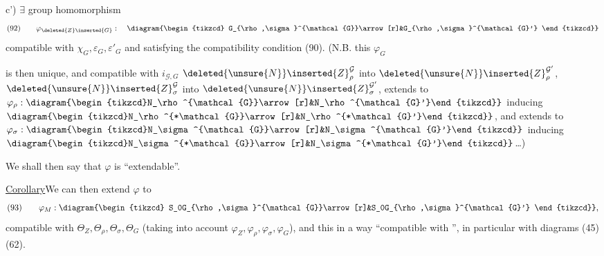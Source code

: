 c') \(\exists\) group homomorphism
\[
(92)\qquad
\varphi_{\deleted{Z}\inserted{G}}:\quad
\diagram{\begin{tikzcd}
G_{\rho,\sigma}^{\mathcal{G}}\arrow[r]&G_{\rho,\sigma}^{\mathcal{G}'}
\end{tikzcd}}
\]
compatible with \(\chi_G,\varepsilon_G,\varepsilon'_G\) and satisfying the
compatibility condition (90). (N.B. this \(\varphi_G\)


is then unique, and compatible with \(i_{\mathcal{G},G}\)
\unsure{;}
\(\deleted{\unsure{N}}\inserted{Z}_\rho^{\mathcal{G}}\) into
\(\deleted{\unsure{N}}\inserted{Z}_\rho^{\mathcal{G}'}\),
\(\deleted{\unsure{N}}\inserted{Z}_\sigma^{\mathcal{G}}\) into
\(\deleted{\unsure{N}}\inserted{Z}_\sigma^{\mathcal{G}'}\),
 extends to
\(\varphi_\rho:\diagram{\begin{tikzcd}N_\rho^{\mathcal{G}}\arrow[r]&N_\rho^{\mathcal{G}'}\end{tikzcd}}\)
inducing
\(\diagram{\begin{tikzcd}N_\rho^{*\mathcal{G}}\arrow[r]&N_\rho^{*\mathcal{G}'}\end{tikzcd}}\),
and extends to
\(\varphi_\sigma:\diagram{\begin{tikzcd}N_\sigma^{\mathcal{G}}\arrow[r]&N_\sigma^{\mathcal{G}'}\end{tikzcd}}\)
inducing
\(\diagram{\begin{tikzcd}N_\sigma^{*\mathcal{G}}\arrow[r]&N_\sigma^{*\mathcal{G}'}\end{tikzcd}}\)\ldots)


We shall then say that \(\varphi\) is ``extendable''.

\uline{Corollary}\quad We can then extend \(\varphi\) to
\[
(93)\qquad\varphi_M:
\diagram{\begin{tikzcd}
S_0G_{\rho,\sigma}^{\mathcal{G}}\arrow[r]&S_0G_{\rho,\sigma}^{\mathcal{G}'}
\end{tikzcd}},
\]
compatible with \(\Theta_Z,\Theta_\rho,\Theta_\sigma,\Theta_G\)
(taking into account \(\varphi_Z,\varphi_\rho,\varphi_\sigma,\varphi_G\)),
and this in a way ``compatible with '', in particular
with diagrams (45) (62).

